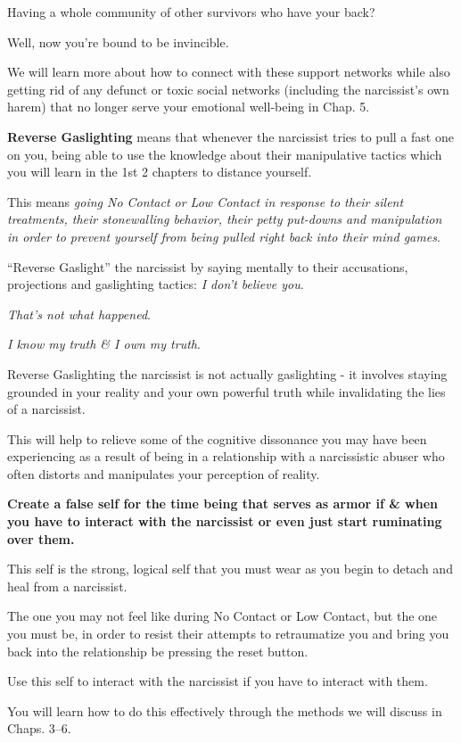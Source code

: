 \documentclass[oneside]{book}
\numberwithin{equation}{section}
\begin{document}
Having a whole community of other survivors who have your back?

Well, now you're bound to be invincible.

We will learn more about how to connect with these support networks while also getting rid of any defunct or toxic social networks (including the narcissist's own harem) that no longer serve your emotional well-being in Chap. 5.

%
\textbf{Reverse Gaslighting} means that whenever the narcissist tries to pull a fast one on you, being able to use the knowledge about their manipulative tactics which you will learn in the 1st 2 chapters to distance yourself.

This means \textit{going No Contact or Low Contact in response to their silent treatments, their stonewalling behavior, their petty put-downs and manipulation in order to prevent yourself from being pulled right back into their mind games}.

%
``Reverse Gaslight'' the narcissist by saying mentally to their accusations, projections and gaslighting tactics: \textit{I don't believe you}.

\textit{That's not what happened}.

\textit{I know my truth \& I own my truth}.

Reverse Gaslighting the narcissist is not actually gaslighting - it involves staying grounded in your reality and your own powerful truth while invalidating the lies of a narcissist.

This will help to relieve some of the cognitive dissonance you may have been experiencing as a result of being in a relationship with a narcissistic abuser who often distorts and manipulates your perception of reality.

%
\textbf{Create a false self for the time being that serves as armor if \& when you have to interact with the narcissist or even just start ruminating over them.}

This self is the strong, logical self that you must wear as you begin to detach and heal from a narcissist.

The one you may not feel like during No Contact or Low Contact, but the one you must be, in order to resist their attempts to retraumatize you and bring you back into the relationship be pressing the reset button.

Use this self to interact with the narcissist if you have to interact with them.

You will learn how to do this effectively through the methods we will discuss in Chaps. 3--6.
\end{document}

